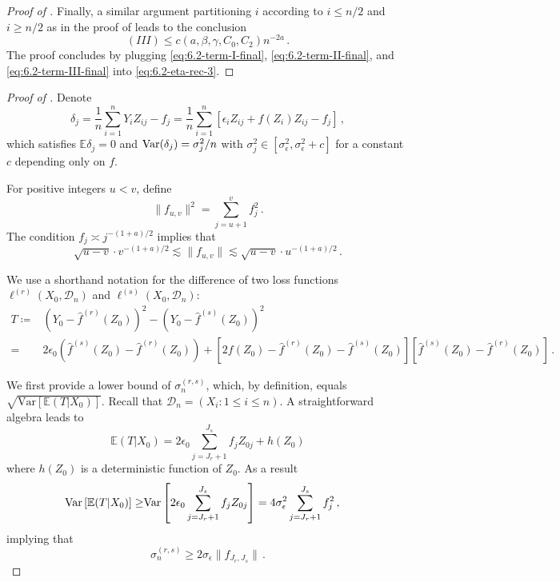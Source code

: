 \documentclass[11pt]{article}
\theoremstyle{plain}
\newcommand{\D}{{\mathcal{D}}}
\newcommand{\var}{\mathrm{Var}}
\begin{document}
\begin{proof}[Proof of ]
Finally, a similar argument partitioning $i$ according to $i\le n/2$ and $i\ge n/2$ as in the proof of  leads to the conclusion
\begin{equation}\label{eq:6.2-term-III-final}
	(III)\le c(a,\beta,\gamma,C_0,C_2) n^{-2a}\,.
\end{equation}
The proof concludes by plugging \eqref{eq:6.2-term-I-final}, \eqref{eq:6.2-term-II-final}, and \eqref{eq:6.2-term-III-final} into \eqref{eq:6.2-eta-rec-3}.
\end{proof}


\begin{proof}[Proof of ]
Denote
$$
\delta_j =\frac{1}{n}\sum_{i=1}^n Y_i Z_{ij}- f_j = \frac{1}{n}\sum_{i=1}^n\left[\epsilon_iZ_{ij}+f(Z_i)Z_{ij}- f_j\right]\,,
$$
which satisfies
$\mathbb E\delta_j=0$ and ${\rm Var}(\delta_j)=\sigma_j^2/n$ with $\sigma_j^2\in [\sigma_\epsilon^2,\sigma_\epsilon^2+c]$ for a constant $c$ depending only on $f$.

For  positive integers $u<v$, define $$
\| f_{u,v}\|^2=\sum_{j=u+1}^v  f_j^2\,.
$$
The condition $ f_j\asymp j^{-(1+a)/2}$ implies that $$\sqrt{u-v}\cdot v^{-(1+a)/2}\lesssim\| f_{u,v}\|\lesssim \sqrt{u-v}\cdot u^{-(1+a)/2}\,.$$


We use a shorthand notation for the difference of two loss functions $\ell^{(r)}(X_0,\D_n)$ and $\ell^{(s)}(X_0,\D_n)$:
\begin{align*}
T\coloneqq &(Y_0-\hat f^{(r)}(Z_0))^2-(Y_0-\hat f^{(s)}(Z_0))^2\\
 =& 2\epsilon_0(\hat f^{(s)}(Z_0)-\hat f^{(r)}(Z_0)) +\left[2f(Z_0)-\hat f^{(r)}(Z_0)-\hat f^{(s)}(Z_0)\right]\left[\hat f^{(s)}(Z_0)-\hat f^{(r)}(Z_0)\right]\,.
\end{align*}

We first provide a lower bound of $\sigma_n^{(r,s)}$, which, by definition, equals
$\sqrt{\var[\mathbb E(T|X_0)]}$.  Recall  that $\D_n=(X_i:1\le i\le n)$.
A straightforward algebra leads to
$$
\mathbb E(T|X_0) = 2\epsilon_0\sum_{j=J_r+1}^{J_s} f_j Z_{0j} + h(Z_0)
$$
where $h(Z_0)$ is a deterministic function of $Z_0$. As a result
\begin{align*}
  {\rm Var}\left[\mathbb E(T|X_0)\right]\ge& \var\left[2\epsilon_0\sum_{j=J_r+1}^{J_s} f_j Z_{0j}\right]=4\sigma_\epsilon^2\sum_{j=J_r+1}^{J_s}f_j^2\,,
\end{align*}
implying that
\begin{equation}\label{eq:6.3-sigma_ss_lower}
\sigma_{n}^{(r,s)} \ge 2\sigma_\epsilon\|f_{J_r,J_s}\|\,.%
\end{equation}


\end{proof}
\end{document}
